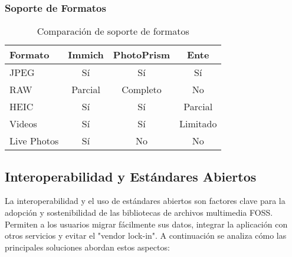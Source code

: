 \subsubsection{Soporte de Formatos}

\begin{table}[H]
\centering
\begin{tabular}{|l|c|c|c|}
\hline
\textbf{Formato} & \textbf{Immich} & \textbf{PhotoPrism} & \textbf{Ente} \\
\hline
JPEG & Sí & Sí & Sí \\
RAW & Parcial & Completo & No \\
HEIC & Sí & Sí & Parcial \\
Videos & Sí & Sí & Limitado \\
Live Photos & Sí & No & No \\
\hline
\end{tabular}
\caption{Comparación de soporte de formatos}
\label{tab:format_support}
\end{table}

\subsection{Interoperabilidad y Estándares Abiertos}

La interoperabilidad y el uso de estándares abiertos son factores clave para la adopción y sostenibilidad de las bibliotecas de archivos multimedia FOSS. Permiten a los usuarios migrar fácilmente sus datos, integrar la aplicación con otros servicios y evitar el "vendor lock-in". A continuación se analiza cómo las principales soluciones abordan estos aspectos:

